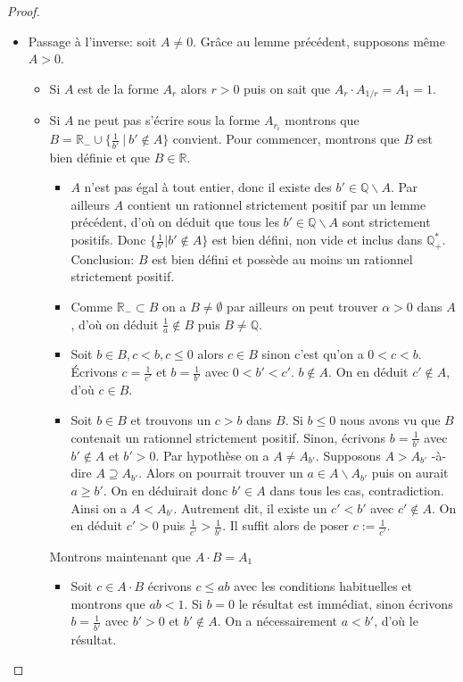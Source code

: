 \documentclass[french]{book}
\theoremstyle{plain}
\theoremstyle{definition}
\theoremstyle{remark}
\begin{document}
\begin{proof}
\begin{itemize}
		\item Passage à l'inverse: soit $A \neq 0$. Grâce au lemme précédent, supposons même $A > 0$.
		\begin{itemize}
			\item[--]Si $A$ est de la forme $A_r$ alors $r > 0$ puis on sait que $A_r \cdot A_{1/r} = A_1 = 1$.
			\item[--]Si $A$ ne peut pas s'écrire sous la forme $A_{r_i}$ montrons que $\displaystyle B = \mathbb{R}_- \cup \{\frac{1}{b'}\ |\ b' \notin A\}$	convient. Pour commencer, montrons que $B$ est bien définie et que $B \in \mathbb{R}$.
			\begin{itemize}
				\item[*]$A$ n'est pas égal à tout entier, donc il existe des $b' \in \mathbb{Q} \backslash A$. Par ailleurs $A$	contient un rationnel strictement positif par un lemme précédent, d'où on déduit que	tous les $b' \in \mathbb{Q} \backslash A$ sont strictement positifs. Donc $\displaystyle\{\frac{1}{b'} | b' \notin A\}$ est bien défini, non vide et inclus dans $\mathbb{Q}_+^*$. Conclusion: $B$ est bien défini et possède au moins un rationnel strictement positif.
				\item[*]Comme $\mathbb{R}_- \subset B$ on a $B \neq \emptyset$ par ailleurs on peut trouver $\alpha > 0$ dans $A$, d'où	on déduit $\frac{1}{a} \notin B$ puis $B \neq \mathbb{Q}$.
				\item[*]Soit $b \in B, c < b, c \leqslant 0$ alors $c \in B$ sinon c'est qu'on a $0 < c < b$. Écrivons $\displaystyle c = \frac{1}{c'}$ et $\displaystyle b = \frac{1}{b'}$ avec $0 < b' < c'$.
				$b \notin A$. On en	déduit $c' \notin A$, d'où $c \in B$.
				\item[*] Soit $b \in B$ et trouvons un $c > b$ dans $B$. Si $b \leqslant 0$ nous avons vu que $B$ contenait un rationnel strictement positif. Sinon, écrivons $\displaystyle b =\frac{1}{b'}$ avec $b' \notin A$ et $b' > 0$.	Par hypothèse on a $A \neq A_{b'}$. Supposons $A > A_{b'}$ -à-dire $A \supseteq A_{b'}$. Alors	on pourrait trouver un $a \in A \backslash A_{b'}$ puis on aurait $a \geqslant b'$. On en déduirait donc $b' \in A$ dans tous les cas, contradiction. Ainsi on a $A <A_{b'}$. Autrement dit, il existe un $c' < b'$ avec $c' \notin A$. On en déduit $c' > 0$ puis $\displaystyle \frac{1}{c'} > \frac{1}{b'}$. Il suffit alors de poser $\displaystyle c := \frac{1}{c'}$.
			\end{itemize}
			Montrons maintenant que $A \cdot B = A_1$
			\begin{itemize}
				\item[*] Soit $c \in A \cdot B$ écrivons $c \leqslant ab$ avec les conditions habituelles et montrons que $ab < 1$. Si $b = 0$ le résultat est immédiat, sinon écrivons $b = \frac{1}{b'}$ avec $b' > 0$ et $b' \notin A$. On a nécessairement $a < b'$, d'où le résultat.

\end{itemize}
\end{itemize}
\end{itemize}
\end{proof}
\end{document}
